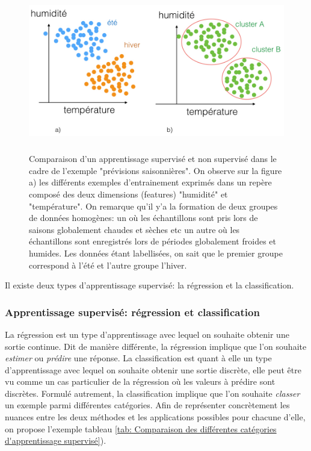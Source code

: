 \begin{figure}[h]
	\centering\includegraphics[height=7cm]{images/apprentissage_meteo.jpeg}
	\caption[Comparaison d'un apprentissage supervisé et non supervisé dans le cadre de l'exemple "prévisions saisonnières"]{Comparaison d'un apprentissage supervisé et non supervisé dans le cadre de l'exemple "prévisions saisonnières". On observe sur la figure a) les différents exemples d'entrainement exprimés dans un repère composé des deux dimensions (features) "humidité" et "température". On remarque qu'il y'a la formation de deux groupes de données homogènes: un où les échantillons sont pris lors de saisons globalement chaudes et sèches etc un autre où les échantillons sont enregistrés lors de périodes globalement froides et humides. Les données étant labellisées, on sait que le premier groupe correspond à l'été et l'autre groupe l'hiver.}
	\label{fig:Comparaison d'un apprentissage supervisé et non supervisé dans le cadre de l'exemple prévision saisonnières}
\end{figure}

Il existe deux types d'apprentissage supervisé: la régression et la classification.


\subsubsection{Apprentissage supervisé: régression et classification} 
\label{Le Machine Learning: Généralités sur le Machine Learning: Le modèle:Regression et classification}
 La régression est un type d'apprentissage avec lequel on souhaite obtenir une sortie continue. Dit de manière différente, la régression implique que l'on souhaite \emph{estimer} ou \emph{prédire} une réponse. La classification est quant à elle un type d'apprentissage avec lequel on souhaite obtenir une sortie discrète, elle peut être vu comme un cas particulier de la régression où les valeurs à prédire sont discrètes. Formulé autrement, la classification implique que l'on souhaite \emph{classer} un exemple parmi différentes catégories. Afin de représenter concrètement les nuances entre les deux méthodes et les applications possibles pour chacune d'elle, on propose l'exemple tableau \ref {tab: Comparaison des différentes catégories d'apprentissage supervisé}).


